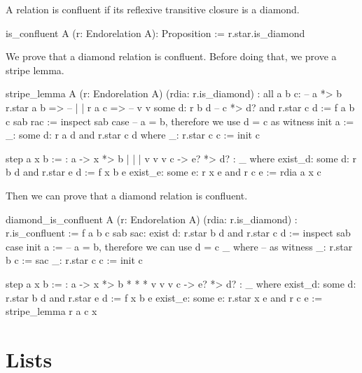 A relation is confluent if its reflexive transitive closure is a diamond.

\begin{alba}
  is_confluent A (r: Endorelation A): Proposition :=
    r.star.is_diamond
\end{alba}



We prove that a diamond relation is confluent. Before doing that, we prove a
stripe lemma.

\begin{alba}
  stripe_lemma
    A
    (r: Endorelation A)
    (rdia: r.is_diamond)
    : all a b c:                       --  a *> b
        r.star a b =>                  --  |    |
        r a c =>                       --  v    v
        some d: r b d                  --  c *> d?
                and
                r.star c d :=
     f a b c sab rac :=
       inspect sab case   -- a = b, therefore we use d = c as witness
         init a :=
           _: some d: r a d and r.star c d  where
             _: r.star c c := init c

         step a x b :=
           {:  a  -> x  *> b
               |     |     |
               v     v     v
               c  -> e? *> d? :}
           _ where
             exist_d: some d: r b d and r.star e d := f x b e
             exist_e: some e: r x e and r c e      := rdia a x c
\end{alba}

Then we can prove that a diamond relation is confluent.

\begin{alba}
  diamond_is_confluent
    A
    (r: Endorelation A)
    (rdia: r.is_diamond)
    : r.is_confluent
    :=
      f a b c sab sac: exist d: r.star b d and r.star c d :=
        inspect sab case
          init a :=            -- a = b, therefore we can use d = c
            _ where            --        as witness
              _: r.star b c := sac
              _: r.star c c := init c

          step a x b :=
            {:  a  ->  x  *>  b
                *      *      *
                v      v      v
                c  ->  e? *>  d? :}
            _ where
              exist_d: some d: r.star b d and r.star e d := f x b e
              exist_e: some e: r.star x e and r c e := stripe_lemma r a c x

\end{alba}




\newpage
\section{Lists}
\label{sec:certprog-lists}


